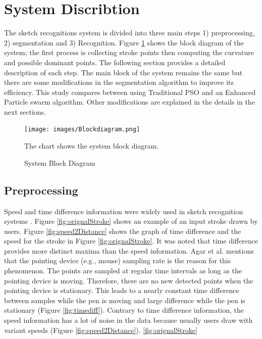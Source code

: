 \documentclass[preprint,1p,times,review]{elsarticle}
\begin{document}
\section{System Discribtion  }\label{Sysdisc}

The sketch recognitions system is divided into three main steps 1) preprocessing, 2) segmentation and 3) Recognition.
Figure \ref{fig:flowChart} shows the block diagram of the system; the first
process is collecting stroke points then computing the curvature and possible
dominant points.  The following section provides a detailed description of each
step. The main block of the system remains the same but there are some
modifications in the segmentation algorithm to improve its efficiency. This study compares between using Traditional PSO and an Enhanced Particle swarm algorithm. Other modifications are explained in the details in
the next sections.

 \begin{figure}
	\centering
		\texttt{[image: images/Blockdiagram.png]}
	\caption{System Block Diagram} The chart shows the system block diagram.
	\label{fig:flowChart}
\end{figure}


\subsection{Preprocessing}
\label{Prepross}

 Speed and time difference information were widely used in sketch recognition
systems \cite{earlyprocess}. Figure \ref{fig:orignalStroke} shows an example of
an input stroke drawn by users.  Figure \ref{fig:speed2Distance} shows the graph
of time difference and the speed for the stroke in Figure
\ref{fig:orignalStroke}. It was noted that time difference provides more
distinct maxima than the speed information. Agar et al. \cite{polygonfeedback31}
mentions that the pointing device (e.g., mouse) sampling rate is the reason for
this phenomenon. The points are sampled at regular time intervals as long as the
pointing device is moving. Therefore, there are no new detected points when the
pointing device is stationary. This leads to a nearly constant time difference
between samples while the pen is moving and large difference while the pen is
stationary (Figure \ref{fig:timediff}). Contrary to time difference information,
the speed information has a lot of noise in the data because usually  users draw
with variant speeds (Figure \ref{fig:speed2Distance}).  %
\ref{fig:orignalStroke}
\end{document}
